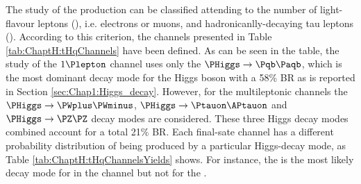 The study of the \tHq production can be classified attending to the number of light-flavour leptons (\Plepton),
i.e. electrons or muons, and hadronicanlly-decaying tau leptons (\tauhad). According to this criterion, the
channels presented in Table \ref{tab:ChaptH:tHqChannels} have been defined. As can be seen in the table,
the study of the $1\Plepton$ channel uses only the $\PHiggs \rightarrow \bbbar$, which is the most dominant
decay mode for the Higgs boson with a 58\% BR as is reported in Section \ref{sec:Chap1:Higgs_decay}.
However, for the multileptonic channels the $\PHiggs \rightarrow \PWplus\PWminus$, %
$\PHiggs \rightarrow  \Ptauon \APtauon$ and $\PHiggs \rightarrow  \PZ\PZ$ decay modes are considered. These three Higgs decay  
modes combined account for a total 21\% BR.
Each final-sate channel has a different probability distribution of being produced by a particular Higgs-decay mode, as
Table \ref{tab:ChaptH:tHqChannelsYields} shows. For instance, the \Htautau is the most likely decay mode for in the
\lepditau channel but not for the \trilep. 

